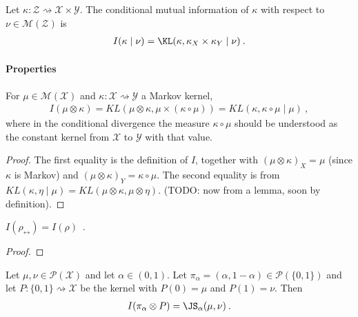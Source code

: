 \begin{definition}
  \label{def:condMutualInfo}
  Let $\kappa : \mathcal Z \rightsquigarrow \mathcal X \times \mathcal Y$. The conditional mutual information of $\kappa$ with respect to $\nu \in \mathcal M(\mathcal Z)$ is
  \begin{align*}
  I(\kappa \mid \nu) = \KL(\kappa, \kappa_X \times \kappa_Y \mid \nu) \: .
  \end{align*}
\end{definition}


\paragraph{Properties}

\begin{lemma}
  \label{lem:mutualInfo_eq_condKL}
  For $\mu \in \mathcal M(\mathcal X)$ and $\kappa : \mathcal X \rightsquigarrow \mathcal Y$ a Markov kernel,
  \begin{align*}
  I(\mu \otimes \kappa)
  = KL(\mu \otimes \kappa, \mu \times (\kappa \circ \mu))
  = KL(\kappa, \kappa \circ \mu \mid \mu)
  \: ,
  \end{align*}
  where in the conditional divergence the measure $\kappa \circ \mu$ should be understood as the constant kernel from $\mathcal X$ to $\mathcal Y$ with that value.
\end{lemma}

\begin{proof}%
\uses{}
The first equality is the definition of $I$, together with $(\mu \otimes \kappa)_X = \mu$ (since $\kappa$ is Markov) and $(\mu \otimes \kappa)_Y = \kappa \circ \mu$.
The second equality is from $KL(\kappa, \eta \mid \mu) = KL(\mu \otimes \kappa, \mu \otimes \eta)$. (TODO: now from a lemma, soon by definition).
\end{proof}


\begin{lemma}
  \label{lem:mutualInfo_symm}
  $I(\rho_\leftrightarrow) = I(\rho)$~.
\end{lemma}

\begin{proof}%
{}

\end{proof}


\begin{lemma}
  \label{lem:mutualInfo_eq_jensenShannon}
  Let $\mu, \nu \in \mathcal P(\mathcal X)$ and let $\alpha \in (0, 1)$. Let $\pi_\alpha = (\alpha, 1 - \alpha) \in \mathcal P(\{0,1\})$ and let $P : \{0,1\} \rightsquigarrow \mathcal X$ be the kernel with $P(0) = \mu$ and $P(1) = \nu$. Then
  \begin{align*}
  I(\pi_\alpha \otimes P) = \JS_\alpha(\mu, \nu) \: .
  \end{align*}
\end{lemma}

